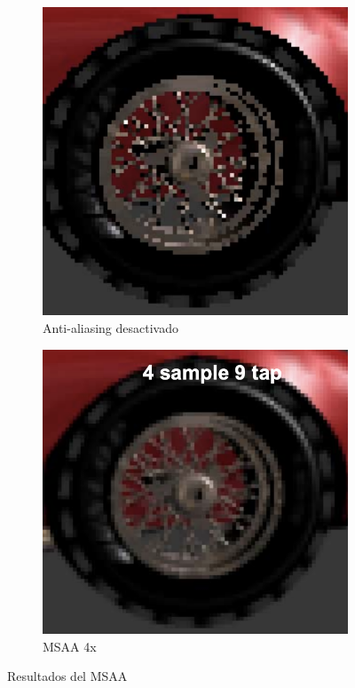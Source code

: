 \documentclass[withindex, glossary]{cam-thesis}
\begin{document}
\begin{figure}[!htbp]
    \centering
    \begin{subfigure}[b]{0.8\textwidth}
        \includegraphics[width=\textwidth]{figures/msaaoff.png}
        \caption{Anti-aliasing desactivado}
    \end{subfigure}
    \centering
    \begin{subfigure}[b]{0.8\textwidth}
        \includegraphics[width=\textwidth]{figures/msaa.png}
        \caption{MSAA 4x}
    \end{subfigure}
    \caption{Resultados del MSAA\label{msaares}}
\end{figure}
\end{document}
